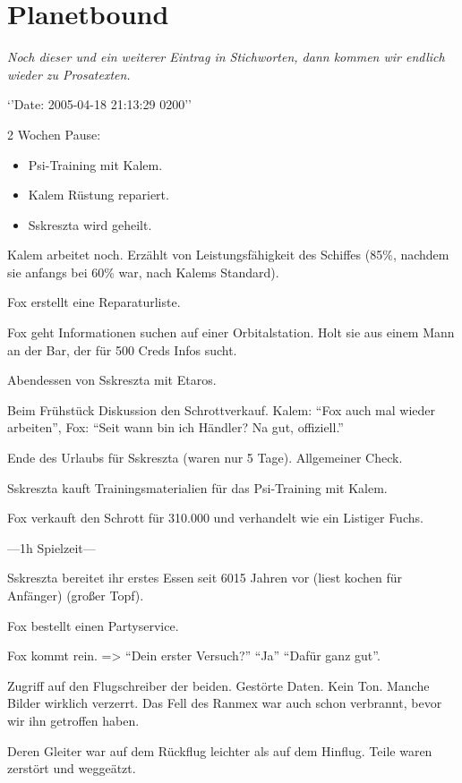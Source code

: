 \documentclass[11pt]{scrartcl}
\begin{document}
\section{Planetbound}

\emph{Noch dieser und ein weiterer Eintrag in Stichworten, dann kommen
wir endlich wieder zu Prosatexten.}

`'Date: 2005-04-18 21:13:29 0200''

2 Wochen Pause:

\begin{itemize}
\item
  Psi-Training mit Kalem.
\item
  Kalem Rüstung repariert.
\item
  Sskreszta wird geheilt.
\end{itemize}
Kalem arbeitet noch. Erzählt von Leistungsfähigkeit des Schiffes (85\%,
nachdem sie anfangs bei 60\% war, nach Kalems Standard).

Fox erstellt eine Reparaturliste.

Fox geht Informationen suchen auf einer Orbitalstation. Holt sie aus
einem Mann an der Bar, der für 500 Creds Infos sucht.

Abendessen von Sskreszta mit Etaros.

Beim Frühstück Diskussion den Schrottverkauf. Kalem: ``Fox auch mal
wieder arbeiten'', Fox: ``Seit wann bin ich Händler? Na gut,
offiziell.''

Ende des Urlaubs für Sskreszta (waren nur 5 Tage). Allgemeiner Check.

Sskreszta kauft Trainingsmaterialien für das Psi-Training mit Kalem.

Fox verkauft den Schrott für 310.000 und verhandelt wie ein Listiger
Fuchs.

---1h Spielzeit---

Sskreszta bereitet ihr erstes Essen seit 6015 Jahren vor (liest kochen
für Anfänger) (großer Topf).

Fox bestellt einen Partyservice.

Fox kommt rein. =\textgreater{} ``Dein erster Versuch?'' ``Ja'' ``Dafür
ganz gut''.

Zugriff auf den Flugschreiber der beiden. Gestörte Daten. Kein Ton.
Manche Bilder wirklich verzerrt. Das Fell des Ranmex war auch schon
verbrannt, bevor wir ihn getroffen haben.

Deren Gleiter war auf dem Rückflug leichter als auf dem Hinflug. Teile
waren zerstört und weggeätzt.
\end{document}
